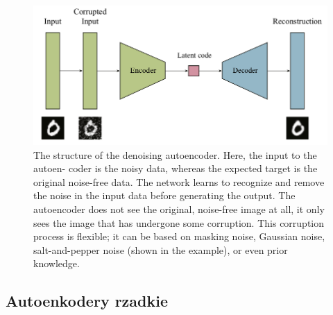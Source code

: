 \documentclass[12pt]{mwbk}
\theoremstyle{plain}
\theoremstyle{definition}
\theoremstyle{remark}
\newcommand\zrodlo[1]{\par\vspace{-3mm}{\small\textit{Źródło: }#1 }}
\begin{document}
\begin{figure}[!h]
	\centering
	\includegraphics[width=\linewidth]{rys/denoising_autoencoder.png}
	\caption{The structure of the denoising autoencoder. Here, the input to the autoen-
		coder is the noisy data, whereas the expected target is the original noise-free data. The
		network learns to recognize and remove the noise in the input data before generating the
		output. The autoencoder does not see the original, noise-free image at all, it only sees the
		image that has undergone some corruption. This corruption process is flexible; it can be
		based on masking noise, Gaussian noise, salt-and-pepper noise (shown in the example), or
		even prior knowledge.}
	\zrodlo{\cite{pinaya}}
	\label{fig:denoising-structure}
\end{figure}


\subsection{Autoenkodery rzadkie}

\cite{geron}
\end{document}
